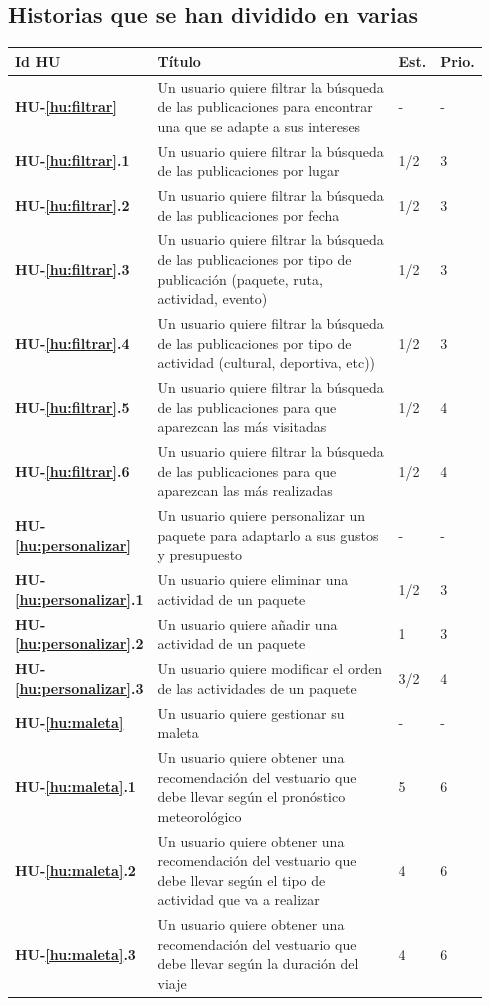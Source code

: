 \documentclass[11pt]{article}
\begin{document}
\subsection{Historias que se han dividido en varias}

  \begin{longtable}{p{0.13\linewidth}p{0.67\linewidth}p{0.07\linewidth}p{0.07\linewidth}}
    \toprule
    \textbf{Id HU} & \textbf{Título} & \textbf{Est.} & \textbf{Prio.}\\
    \midrule
    
  \textbf{HU-\ref{hu:filtrar}} & Un usuario quiere filtrar la búsqueda de las publicaciones para encontrar una que se adapte a sus intereses & - & -\\ 
	\textbf{HU-\ref{hu:filtrar}.1} & Un usuario quiere filtrar la búsqueda de las publicaciones por lugar & 1/2 & 3\\ 
	\textbf{HU-\ref{hu:filtrar}.2} & Un usuario quiere filtrar la búsqueda de las publicaciones por fecha & 1/2 & 3\\ 
	\textbf{HU-\ref{hu:filtrar}.3} & Un usuario quiere filtrar la búsqueda de las publicaciones por tipo de publicación (paquete, ruta, actividad, evento) & 1/2 & 3\\ 
	\textbf{HU-\ref{hu:filtrar}.4} & Un usuario quiere filtrar la búsqueda de las publicaciones por tipo de actividad (cultural, deportiva, etc)) & 1/2 & 3\\ 
	\textbf{HU-\ref{hu:filtrar}.5} & Un usuario quiere filtrar la búsqueda de las publicaciones para que aparezcan las más visitadas & 1/2 & 4\\ 
	\textbf{HU-\ref{hu:filtrar}.6} & Un usuario quiere filtrar la búsqueda de las publicaciones para que aparezcan las más realizadas & 1/2 & 4\\ 
	\midrule
	\textbf{HU-\ref{hu:personalizar}} & Un usuario quiere personalizar un paquete para adaptarlo a sus gustos y presupuesto & - & - \\
	\textbf{HU-\ref{hu:personalizar}.1} & Un usuario quiere eliminar una actividad de un paquete & 1/2 & 3 \\ 
	\textbf{HU-\ref{hu:personalizar}.2} & Un usuario quiere añadir una actividad de un paquete & 1 & 3 \\ 
	\textbf{HU-\ref{hu:personalizar}.3} & Un usuario quiere modificar el orden de las actividades de un paquete & 3/2 & 4 \\
	\midrule 
	\textbf{HU-\ref{hu:maleta}} & Un usuario quiere gestionar su maleta & - & -\\
	\textbf{HU-\ref{hu:maleta}.1} & Un usuario quiere obtener una recomendación del vestuario que debe llevar según el pronóstico meteorológico & 5 & 6\\
	\textbf{HU-\ref{hu:maleta}.2} & Un usuario quiere obtener una recomendación del vestuario que debe llevar según el tipo de actividad que va a realizar & 4 & 6\\
	\textbf{HU-\ref{hu:maleta}.3} & Un usuario quiere obtener una recomendación del vestuario que debe llevar según la duración del viaje & 4 & 6\\
    \bottomrule
  \end{longtable}
\end{document}
